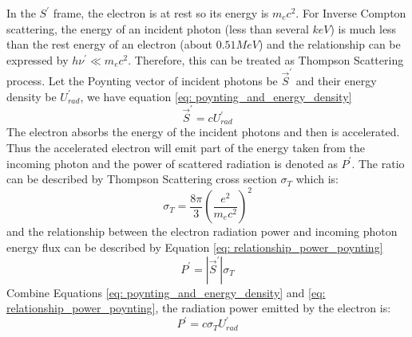 \documentclass[12pt]{report}
\begin{document}
      In the $S^{\prime}$ frame, the electron is at rest so its energy is $m_e c^2$. 
      For Inverse Compton scattering, the energy of an incident photon 
      (less than several $keV$) is much less than the rest energy of an electron 
      (about $0.51MeV$) and the relationship can be expressed by 
      $h\nu^{\prime} \ll m_e c^2$. Therefore, this can be treated as Thompson 
      Scattering process. Let the Poynting vector of incident photons be 
      $\vec{S}^{\prime}$ and their energy density be $U_{rad}^{\prime}$, we have 
      equation \ref{eq: poynting_and_energy_density}
      \begin{equation}
        \label{eq: poynting_and_energy_density}
        \vec{S}^{\prime} = c U_{rad}^{\prime}
      \end{equation}
      The electron absorbs the energy of the incident photons and then is accelerated. 
      Thus the accelerated electron will emit part of the energy taken from the incoming 
      photon and the power of scattered radiation is denoted as $P^{\prime}$.
      The ratio can be described by Thompson Scattering cross section $\sigma_{T}$ 
      which is:
      \begin{equation}
        \label{eq: thompson_cross_section}
        \sigma_{T} = \frac{8\pi}{3} \left(\frac{e^2}{m_e c^2}\right)^2
      \end{equation}
      and the relationship between the electron radiation power and incoming photon 
      energy flux can be described by Equation \ref{eq: relationship_power_poynting}
      \begin{equation}
        \label{eq: relationship_power_poynting}
        P^{\prime} = \left| \vec{S}^{\prime} \right| \sigma_{T}
      \end{equation}
      Combine Equations \ref{eq: poynting_and_energy_density} and 
      \ref{eq: relationship_power_poynting}, the radiation power emitted by the 
      electron is: 
      \begin{equation}
        \label{eq: final_relationship}
        P^{\prime} = c \sigma_{T} U^{\prime}_{rad}
      \end{equation}
\end{document}

